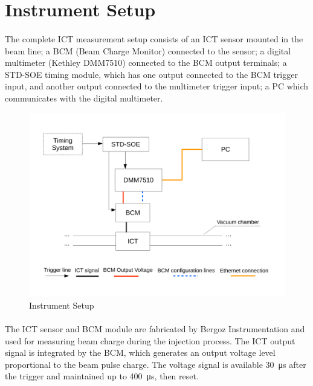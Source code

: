 \documentclass[openany]{article}
\begin{document}
\section{Instrument Setup}

	\paragraph{} The complete ICT measurement setup consists of an ICT sensor mounted in the beam line; a BCM (Beam Charge Monitor) connected to the sensor; a digital multimeter (Kethley DMM7510) connected to the BCM output terminals; a STD-SOE timing module, which has one output connected to the BCM trigger input, and another output connected to the multimeter trigger input; a PC which communicates with the digital multimeter.

	\begin{figure}[!h]
		\caption{Instrument Setup}
		\label{fig:ict-setup}
		\centering
		\includegraphics[width=1.0\textwidth]{ict-setup-image}
	\end{figure}
\FloatBarrier

	\paragraph{} The ICT sensor and BCM module are fabricated by Bergoz Instrumentation and used for measuring beam charge during the injection process. The ICT output signal is integrated by the BCM, which generates an output voltage level proportional to the beam pulse charge. The voltage signal is available \SI{30}{\micro\second} after the trigger and maintained up to \SI{400}{\micro\second}, then reset.
\end{document}
